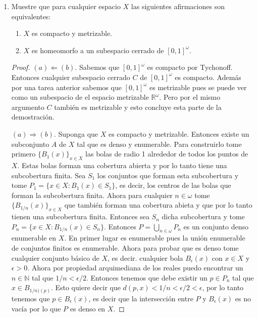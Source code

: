 \documentclass[letter,twoside,12pt]{article}
\begin{document}
\begin{enumerate}
\begin{proof}
Por lo tanto, tenemos que $ \bigcap_{n = 0 }^m \overline{V_n} = \overline{V_m} \not = \emptyset $ y por compacidad de $ X $ concluimos que $ \bigcap_{n \in \omega} \overline{V_n} \not = \emptyset $. Por ultimo tenemos que $ \overline{V_n} \subseteq A \cap U_n $. Por lo tanto,  $ \bigcap_{n \in \omega} \overline{V_n} \subseteq  \bigcap_{n \in \omega} A \cap U_n = A \cap (\bigcap_{n \in \omega} U_n)$. Por lo tanto, este ultimo no es vacío y concluimos que $ \bigcap_{n \in \omega} U_n $ es denso.
\end{proof}
\item Muestre que para cualquier espacio $ X $ las siguientes afirmaciones son equivalentes:
\begin{enumerate}
\item $ X $ es compacto y metrizable.
\item $ X $ es homeomorfo a un subespacio cerrado de $ [0,1]^\omega $.
\end{enumerate}
\begin{proof}
$ (a) \Leftarrow (b) $. Sabemos que $ [0,1]^{\omega} $ es compacto por Tychonoff. Entonces cualquier subespacio cerrado $ C $ de $ [0,1]^{\omega} $ es compacto. Además por una tarea anterior sabemos que $ [0,1]^{\omega} $ es metrizable pues se puede ver como un subespacio de el espacio metrizable $ \mathbb{R}^\omega $. Pero por el mismo argumento $ C $ también es metrizable y esto concluye esta parte de la demostración.

$ (a) \Rightarrow (b) $. Suponga que $ X $ es compacto y metrizable. Entonces existe un subconjunto $ A $ de $ X $ tal que es denso y enumerable. Para construirlo tome primero $ \{B_1(x)\}_{x \in X} $ las bolas de radio 1 alrededor de todos los puntos de $ X $. Estas bolas forman una cobertura abierta y por lo tanto tiene una subcobertura finita. Sea $ S_1 $ los conjuntos que forman esta subcobertura y tome $ P_1 = \{x \in X: B_1(x) \in S_1 \} $, es decir, los centros de las bolas que forman la subcobertura finita. Ahora para cualquier $ n \in \omega $ tome $ \{B_{1/n}(x)\}_{x \in X} $ que también forman una cobertura abieta y que por lo tanto tienen una subcobertura finita. Entonces sea $ S_n $ dicha subcobertura y tome $ P_n = \{ x \in X: B_{1/n}(x) \in S_n \} $. Entonces $ P = \bigcup_{n \in \omega} P_n $ es un conjunto denso enumerable en $ X $. En primer lugar es enumerable pues la unión enumerable de conjuntos finitos es enumerable. Ahora para probar que es denso tome cualquier conjunto básico de $ X $, es decir. cualquier bola $ B_\epsilon(x) $ con $ x \in X $ y $ \epsilon > 0 $. Ahora por propiedad arquimediana de los reales puedo encontrar un $ n \in \mathbb{N} $ tal que $ 1/n < \epsilon/2 $. Entonces tenemos que debe existir un $ p \in P_n $ tal que $ x \in B_{1/n)(p)}$. Esto quiere decir que $ d(p,x)<1/n<\epsilon/2<\epsilon $, por lo tanto tenemos que $ p \in B_{\epsilon}(x) $, es decir que la intersección entre $ P $ y $ B_\epsilon(x) $ es no vacía por lo que $ P $ es denso en $ X $.


\end{proof}
\end{enumerate}
\end{document}
